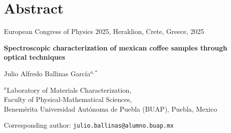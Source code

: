 \documentclass{article}
\newcommand{\PaperTitle}{}        %
\newcommand{\PaperAuthors}{}      %
\newcommand{\PaperAffils}{}       %
\newcommand{\PaperDates}{}        %
\newcommand{\PaperJournal}{}      %
\begin{document}
\section{Abstract}

\renewcommand{\PaperJournal}{European Congress of Physics 2025, Heraklion, Crete, Greece, 2025}
\renewcommand{\PaperTitle}{Spectroscopic characterization of mexican coffee samples through optical techniques}
\renewcommand{\PaperAuthors}{Julio Alfredo Ballinas García$^{a,*}$}
\renewcommand{\PaperAffils}{$^{a}$Laboratory of Materials Characterization, \\
Faculty of Physical-Mathematical Sciences, \\
Benemérita Universidad Autónoma de Puebla (BUAP), Puebla, Mexico}
\renewcommand{\PaperDates}{Corresponding author: \texttt{julio.ballinas@alumno.buap.mx}}

\begin{articleheader}
  {\small\PaperJournal\par}
  {\Large\bfseries \PaperTitle\par}
  \vspace{4pt}
  {\normalsize \PaperAuthors\par}
  {\footnotesize \PaperAffils\par}
  {\scriptsize \PaperDates\par}
\end{articleheader}
\end{document}
